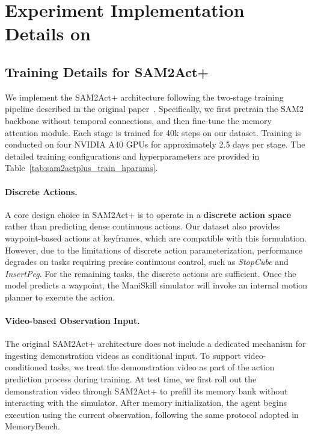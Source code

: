 \section{Experiment Implementation Details on \benchname}
\label{sec:appx_imp_detail}

\subsection{Training Details for SAM2Act+}
\label{sec:sam2act}

We implement the SAM2Act+ architecture following the two-stage training pipeline described in the original paper~\cite{fang2025sam2act}. 
Specifically, we first pretrain the SAM2 backbone without temporal connections, and then fine-tune the memory attention module. 
Each stage is trained for 40k steps on our dataset. 
Training is conducted on four NVIDIA A40 GPUs for approximately 2.5 days per stage. 
The detailed training configurations and hyperparameters are provided in Table~\ref{tab:sam2actplus_train_hparams}.

\paragraph{Discrete Actions.}
A core design choice in SAM2Act+ is to operate in a \textbf{discrete action space} rather than predicting dense continuous actions. 
Our dataset also provides waypoint-based actions at keyframes, which are compatible with this formulation. 
However, due to the limitations of discrete action parameterization, performance degrades on tasks requiring precise continuous control, such as \textit{StopCube} and \textit{InsertPeg}. 
For the remaining tasks, the discrete actions are sufficient. 
Once the model predicts a waypoint, the ManiSkill simulator will invoke an internal motion planner to execute the action.

\paragraph{Video-based Observation Input.}
The original SAM2Act+ architecture does not include a dedicated mechanism for ingesting demonstration videos as conditional input. 
To support video-conditioned tasks, we treat the demonstration video as part of the action prediction process during training. 
At test time, we first roll out the demonstration video through SAM2Act+ to prefill its memory bank without interacting with the simulator. 
After memory initialization, the agent begins execution using the current observation, following the same protocol adopted in MemoryBench.

